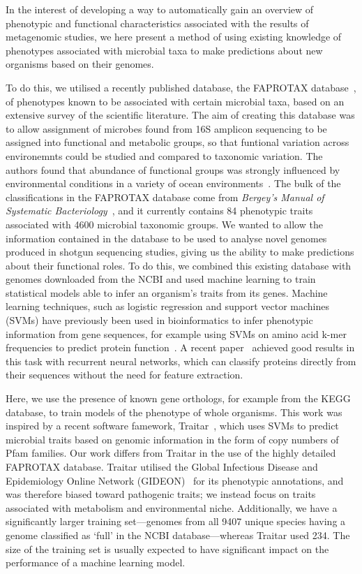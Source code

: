 \documentclass[10pt,letterpaper]{article}
\begin{document}
In the interest of developing a way to automatically gain an overview of phenotypic and functional characteristics associated with the results of metagenomic studies, we here present a method of using existing knowledge of phenotypes associated with microbial taxa to make predictions about new organisms based on their genomes.

To do this, we utilised a recently published database, the FAPROTAX database~\cite{Louca2016,Louca2017}, of phenotypes known to be associated with certain microbial taxa, based on an extensive survey of the scientific literature. The aim of creating this database was to allow assignment of microbes found from 16S amplicon sequencing to be assigned into functional and metabolic groups, so that funtional variation across environemnts could be studied and compared to taxonomic variation. The authors found that abundance of functional groups was strongly influenced by environmental conditions in a variety of ocean environments~\cite{Louca2016a}. The bulk of the classifications in the FAPROTAX database come from \emph{Bergey's Manual of Systematic Bacteriology}~\cite{Whitman}, and it currently contains 84 phenotypic traits associated with 4600 microbial taxonomic groups. We wanted to allow the information contained in the database to be used to analyse novel genomes produced in shotgun sequencing studies, giving us the ability to make predictions about their functional roles. To do this, we combined this existing database with genomes downloaded from the NCBI and used machine learning to train statistical models able to infer an organism's traits from its genes. Machine learning techniques, such as logistic regression and support vector machines (SVMs) have previously been used in bioinformatics to infer phenotypic information from gene sequences, for example using SVMs on amino acid k-mer frequencies to predict protein function~\cite{Leslie2002,Cai2003,Someya2010}. A recent paper~\cite{Asgari2015} achieved good results in this task with recurrent neural networks, which can classify proteins directly from their sequences without the need for feature extraction. 

Here, we use the presence of known gene orthologs, for example from the KEGG database, to train models of the phenotype of whole organisms. This work was inspired by a recent software famework, Traitar~\cite{Weimann2016}, which uses SVMs to predict microbial traits based on genomic information in the form of copy numbers of Pfam families. Our work differs from Traitar in the use of the highly detailed FAPROTAX database. Traitar utilised the Global Infectious Disease and Epidemiology Online Network (GIDEON)~\cite{Berger2005} for its phenotypic annotations, and was therefore biased toward pathogenic traits; we instead focus on traits associated with metabolism and environmental niche. Additionally, we have a significantly larger training set---genomes from all 9407 unique species having a genome classified as `full' in the NCBI database---whereas Traitar used 234. The size of the training set is usually expected to have significant impact on the performance of a machine learning model.
\end{document}
